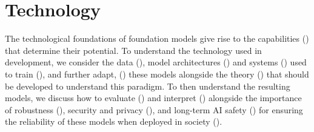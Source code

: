 \section{Technology}
\label{sec:technology}

The technological foundations of foundation models give rise to the capabilities () that determine their potential. 
To understand the technology used in development, we consider the data (), model architectures () and systems () used to train (), and further adapt, () these models alongside the theory () that should be developed to understand this paradigm.
To then understand the resulting models, we discuss how to evaluate () and interpret () alongside the importance of robustness (), security and privacy (), and long-term AI safety () for ensuring the reliability of these models when deployed in society ().














